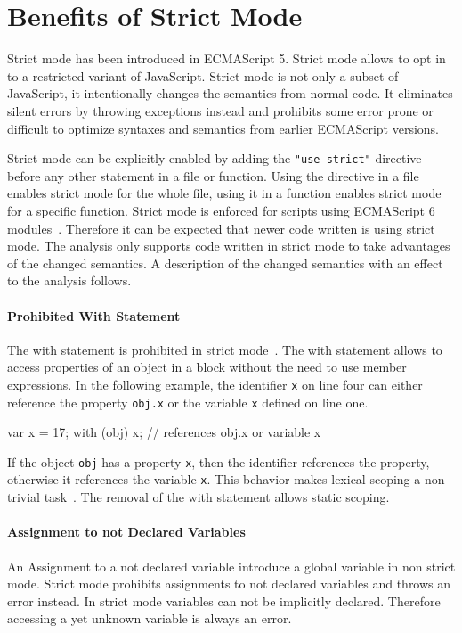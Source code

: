 \section{Benefits of Strict Mode}\label{sec:strict-mode}
Strict mode has been introduced in ECMAScript 5. Strict mode allows to opt in to a restricted variant of JavaScript. Strict mode is not only a subset of JavaScript, it intentionally changes the semantics from normal code. It eliminates silent errors by throwing exceptions instead and prohibits some error prone or difficult to optimize syntaxes and semantics from earlier ECMAScript versions. 

Strict mode can be explicitly enabled by adding the \texttt{"use strict"} directive before any other statement in a file or function. Using the directive in a file enables strict mode for the whole file, using it in a function enables strict mode for a specific function. Strict mode is enforced for scripts using ECMAScript 6 modules~\cite[10.2.1]{Ecma2015}. Therefore it can be expected that newer code written is using strict mode. The analysis only supports code written in strict mode to take advantages of the changed semantics. A description of the changed semantics with an effect to the analysis follows.

\paragraph{Prohibited With Statement}
The with statement is prohibited in strict mode~\cite[Annex C]{Ecma2015}. The with statement allows to access properties of an object in a block without the need to use member expressions. In the following example, the identifier \texttt{x} on line four can either reference the property \texttt{obj.x} or the variable \texttt{x} defined on line one.

\begin{javascriptcode}
var x = 17;
with (obj) {
	x; // references obj.x or variable x
}
\end{javascriptcode}

If the object \texttt{obj} has a property \texttt{x}, then the identifier references the property, otherwise it references the variable \texttt{x}. This behavior makes lexical scoping a non trivial task~\cite{JensenMollerThiemann2009}. The removal of the with statement allows static scoping.

\paragraph{Assignment to not Declared Variables}
An Assignment to a not declared variable introduce a global variable in non strict mode. Strict mode prohibits assignments to not declared variables and throws an error instead. In strict mode variables can not be implicitly declared. Therefore accessing a yet unknown variable is always an error.